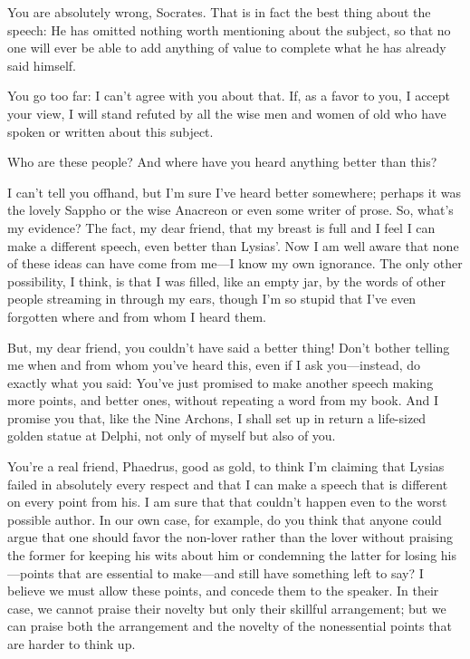 \sayphaedrus You are absolutely wrong, Socrates. That is in fact
the best thing about the speech: He has omitted nothing worth mentioning
about the subject, so that no one will ever be able to add anything of
value to complete what he has already said himself.

\saysocrates You go too far: I can't agree with you about that. If, as a
favor to you, I accept your view, I will stand refuted by all the wise
men and women of old who have spoken or written about this subject.

\sayphaedrus Who are these people? And where have you heard anything 
better than this?

\saysocrates I can't tell you offhand, but I'm sure I've heard better
somewhere; perhaps it was the lovely Sappho or the wise Anacreon or even
some writer of prose. So, what's my evidence? The fact, my dear friend,
that my breast is full and I feel I can make a different speech, even
better than Lysias'. Now I am well aware that none of these ideas can
have come from me---I know my own ignorance. The only other possibility,
I think, is that I was filled, like an empty jar, by the words
of other people streaming in through my ears, though I'm so stupid that
I've even forgotten where and from whom I heard them.

\sayphaedrus But, my dear friend, you couldn't have said a better thing!
Don't bother telling me when and from whom you've heard this, even if I
ask you---instead, do exactly what you said: You've just promised to
make another speech making more points, and better ones, without
repeating a word from my book. And I promise you that, like the Nine
Archons, I shall set up in return a life-sized golden statue at
Delphi, not only of myself but also of
you.

\saysocrates You're a real friend, Phaedrus, good as gold, to think I'm
claiming that Lysias failed in absolutely every respect and that I can
make a speech that is different on every point from his. I am sure that
that couldn't happen even to the worst possible author. In our own case,
for example, do you think that anyone could argue that one should favor
the non-lover rather than the lover without praising the former for
keeping his wits about him or condemning the latter for
losing his---points that are essential to make---and still have
something left to say? I believe we must allow these points, and concede
them to the speaker. In their case, we cannot praise their novelty but
only their skillful arrangement; but we can praise both the arrangement
and the novelty of the nonessential points that are harder to think up.

